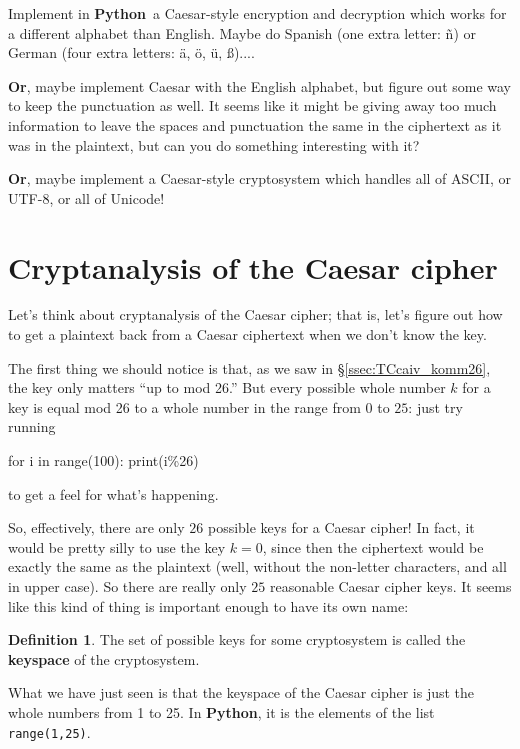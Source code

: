 \documentclass[12pt,letterpaper]{amsbook}
\theoremstyle{definition}
\newtheorem{definition}[theorem]{Definition}
\theoremstyle{remark}
\numberwithin{figure}{section}
\numberwithin{exercise}{chapter}
\numberwithin{section}{chapter}
\numberwithin{equation}{section}
\numberwithin{table}{subsection}
\newcommand{\code}[1]{\colorbox{lg}{\texttt{#1}}}
\newcommand{\Python}{{\textbf{\ix{Python}}}}
\newcommand{\ix}[1]{{#1}\index{#1}}
\begin{document}
\vskip2mm
\begin{BTtcb}[label=bt:generalizedCaesar]{}{}
  Implement in \Python\ a Caesar-style encryption and decryption which works
  for a different alphabet than English.  Maybe do Spanish (one extra letter:
  \~n) or German (four extra letters: \"a, \"o, \"u, ß)....

  \textbf{Or}, maybe implement Caesar with the English alphabet, but figure
  out some way to keep the punctuation as well.  It seems like it might be
  giving away too much information to leave the spaces and punctuation the
  same in the ciphertext as it was in the plaintext, but can you do something
  interesting with it?

  \textbf{Or}, maybe implement a Caesar-style cryptosystem which handles all
  of ASCII, or UTF-8, or all of Unicode!
\end{BTtcb}

\vfill
\pagebreak
\section{Cryptanalysis of the Caesar cipher}\label{sec:CotCc}

Let's think about cryptanalysis of the Caesar cipher; that is, let's figure
out how to get a plaintext back from a Caesar ciphertext when we don't know
the key.

The first thing we should notice is that, as we saw in
\S\ref{ssec:TCcaiv_komm26}, the key only matters ``up to mod 26.''  But every
possible whole number $k$ for a key is equal mod 26 to a whole number in the
range from $0$ to $25$: just try running\\
\begin{codedisp}
  for i in range(100):
    print(i\%26)
\end{codedisp}

\noindent to get a feel for what's happening.

So, effectively, there are only $26$ possible keys for a Caesar cipher!  In
fact, it would be pretty silly to use the key $k=0$, since then the ciphertext
would be exactly the same as the plaintext (well, without the non-letter
characters, and all in upper case).  So there are really only $25$ reasonable
Caesar cipher keys.  It seems like this kind of thing is important enough to
have its own name:
\begin{definition}
  \label{def:keyspace}
  The set of possible keys for some cryptosystem is called the \textbf{keyspace}
  of the cryptosystem.
\end{definition}
What we have just seen is that the keyspace of the Caesar cipher is just the
whole numbers from 1 to 25.  In \Python, it is the elements of the list
\code{range(1,25)}.
\end{document}
